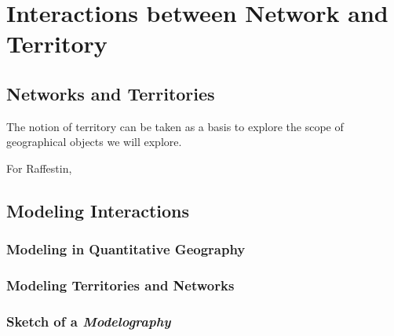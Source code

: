 





\chapter{Interactions between Network and Territory} %

\label{ch:quantepistemo} %


%







\section{Networks and Territories}



The notion of territory can be taken as a basis to explore the scope of geographical objects we will explore.

For Raffestin, 








\section{Modeling Interactions}


\subsection{Modeling in Quantitative Geography}





\subsection{Modeling Territories and Networks}





\subsection{Sketch of a \emph{Modelography}}










